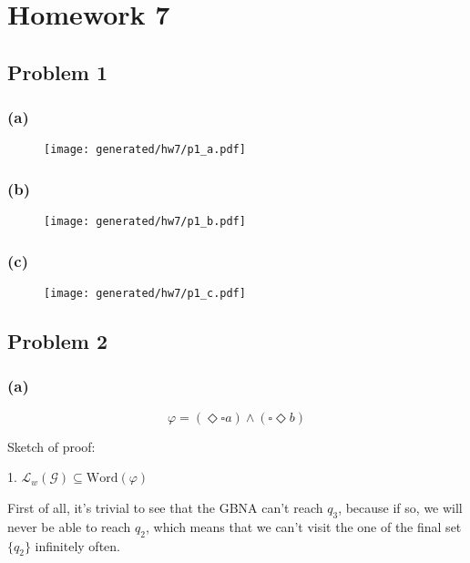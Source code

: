 \chapter{Homework 7}

\section{Problem 1}

\subsection*{(a)}

\begin{figure}[H]
    \centering
    \texttt{[image: generated/hw7/p1\_a.pdf]}
\end{figure}

\subsection*{(b)}

\begin{figure}[H]
    \centering
    \texttt{[image: generated/hw7/p1\_b.pdf]}
\end{figure}

\subsection*{(c)}

\begin{figure}[H]
    \centering
    \texttt{[image: generated/hw7/p1\_c.pdf]}
\end{figure}

\section{Problem 2}

\subsection*{(a)}

$$
\varphi = (\Diamond \square a) \wedge (\square \Diamond b)
$$

Sketch of proof:

1. $\mathcal{L}_w(\mathcal{G}) \subseteq \text{Word}(\varphi)$

First of all, it's trivial to see that the GBNA can't reach $q_3$, because if so,
we will never be able to reach $q_2$, which means that we can't visit the one of the final
set $\{q_2\}$ infinitely often.

